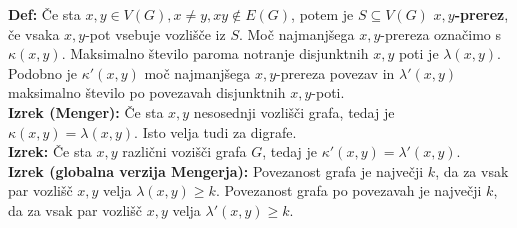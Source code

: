 \documentclass[a4paper,10pt]{article}
\theoremstyle{definition}
\let\oldtextbf\textbf
\renewcommand{\textbf}[1]{\oldtextbf{\boldmath #1}}
\begin{document}
\textbf{Def:} Če sta $x, y \in V(G), x \neq y, xy \notin E(G)$, potem je $S \subseteq V(G)$ \textbf{$x, y$-prerez}, če vsaka $x,y$-pot vsebuje vozlišče iz $S$. Moč najmanjšega $x,y$-prereza označimo s \textbf{$\kappa(x, y)$}. Maksimalno število paroma notranje disjunktnih $x, y$ poti je \textbf{$\lambda(x, y)$}. Podobno je \textbf{$\kappa'(x, y)$} moč najmanjšega $x, y$-prereza povezav in \textbf{$\lambda'(x, y)$} maksimalno število po povezavah disjunktnih $x, y$-poti.\\
\textbf{Izrek (Menger):} Če sta $x, y$ nesosednji vozlišči grafa, tedaj je $\kappa(x, y) = \lambda(x, y)$. Isto velja tudi za digrafe.\\
\textbf{Izrek:} Če sta $x, y$ različni vozišči grafa $G$, tedaj je $\kappa'(x, y) = \lambda'(x, y)$.\\
\textbf{Izrek (globalna verzija Mengerja):} Povezanost grafa je največji $k$, da za vsak par vozlišč $x, y$ velja $\lambda(x, y) \geq k$. Povezanost grafa po povezavah je največji $k$, da za vsak par vozlišč $x, y$ velja $\lambda'(x, y) \geq k$.
\end{document}

